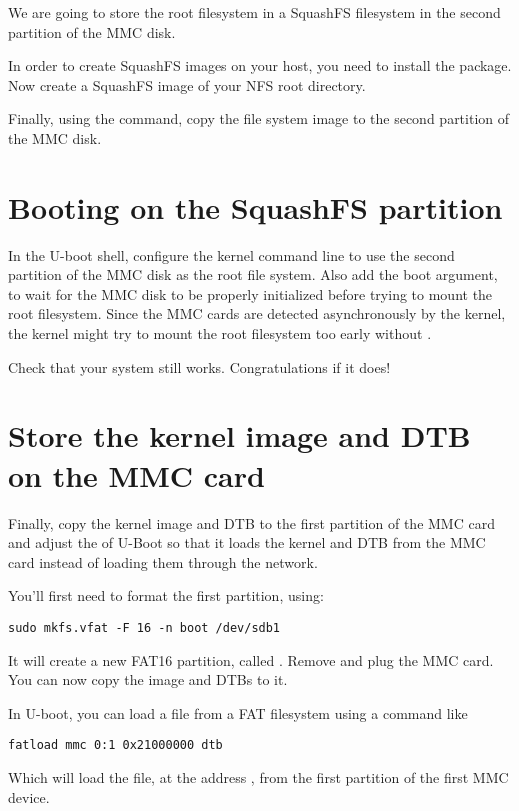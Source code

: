 We are going to store the root filesystem in a SquashFS filesystem in
the second partition of the MMC disk.

In order to create SquashFS images on your host, you need to install
the  package. Now create a SquashFS image of your
NFS root directory.

Finally, using the  command, copy the file system image to
the second partition of the MMC disk.

\section{Booting on the SquashFS partition}

In the U-boot shell, configure the kernel command line to use the
second partition of the MMC disk as the root file system. Also add the
 boot argument, to wait for the MMC disk to be properly
initialized before trying to mount the root filesystem. Since the MMC
cards are detected asynchronously by the kernel, the kernel might try
to mount the root filesystem too early without .

Check that your system still works. Congratulations if it does!

\section{Store the kernel image and DTB on the MMC card}

Finally, copy the  kernel image and DTB to the first
partition of the MMC card and adjust the  of U-Boot so
that it loads the kernel and DTB from the MMC card instead of loading
them through the network.

You'll first need to format the first partition, using:
\begin{verbatim}
sudo mkfs.vfat -F 16 -n boot /dev/sdb1
\end{verbatim}

It will create a new FAT16 partition, called . Remove and
plug the MMC card. You can now copy the image and DTBs to it.

In U-boot, you can load a file from a FAT filesystem using a command
like

\begin{verbatim}
fatload mmc 0:1 0x21000000 dtb
\end{verbatim}

Which will load the  file, at the address ,
from the first partition of the first MMC device.
